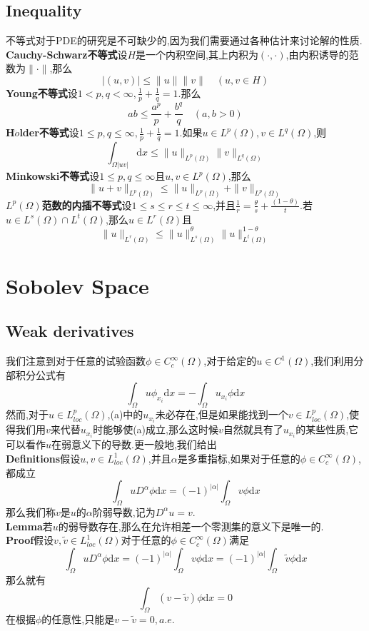 \documentclass[a4paper,UTF8,12pt]{ctexart}
\begin{document}
\subsection{Inequality}
不等式对于PDE的研究是不可缺少的,因为我们需要通过各种估计来讨论解的性质.\\
\textbf{Cauchy-Schwarz不等式}\quad 设$H$是一个内积空间,其上内积为$(\cdot,\cdot)$,由内积诱导的范数为$\|\cdot\|$,那么
$$
|(u,v)|\leqslant\|u\|\|v\|\quad (u,v\in H)
$$
\textbf{Young不等式}\quad 设$1<p,q<\infty,\frac{1}{p}+\frac{1}{q}=1$.那么
$$
ab\leqslant \frac{a^p}{p}+\frac{b^q}{q}\quad (a,b>0)
$$
\textbf{H$\ddot{o}$lder不等式}\quad 设$1\leqslant p,q\leqslant\infty,\frac{1}{p}+\frac{1}{q}=1$.如果$u\in L^p(\Omega),v\in L^q(\Omega)$,则
$$
\int_{\Omega|uv|}\mathrm{d}x\leqslant \|u\|_{L^p(\Omega)}\|v\|_{L^q(\Omega)}
$$
\textbf{Minkowski不等式}\quad 设$1\leqslant p,q\leqslant\infty$且$u,v\in L^p(\Omega)$,那么
$$
\|u+v\|_{L^p(\Omega)}\leqslant \|u\|_{L^p(\Omega)}+\|v\|_{L^p(\Omega)}
$$
\textbf{$L^p(\Omega)$范数的内插不等式}\quad 设$1\leqslant s\leqslant r\leqslant t\leqslant \infty$,并且$\frac{1}{r}=\frac{\theta}{s}+\frac{(1-\theta)}{t}$.若$u\in L^s(\Omega)\cap L^t(\Omega)$,那么$u\in L^r(\Omega)$且
$$
\|u\|_{L^r(\Omega)}\leqslant\|u\|^{\theta}_{L^s(\Omega)}\|u\|^{1-\theta}_{L^t(\Omega)}
$$
\section{Sobolev Space}
\subsection{Weak derivatives}
我们注意到对于任意的试验函数$\phi \in C^\infty _c(\Omega)$,对于给定的$u\in C^1(\Omega)$,我们利用分部积分公式有
\begin{equation}
    \int_{\Omega}u\phi_{x_i}\mathrm{d}x=-\int_{\Omega}u_{x_i}\phi\mathrm{d}x \tag{a}
\end{equation}
然而,对于$u\in L^p_{loc}(\Omega)$,(a)中的$u_{x_i}$未必存在,但是如果能找到一个$v\in L^p_{loc}(\Omega)$,使得我们用$v$来代替$u_{x_i}$时能够使(a)成立,那么这时候$v$自然就具有了$u_{x_i}$的某些性质,它可以看作$u$在弱意义下的导数.更一般地,我们给出\\
\textbf{Definitions}\quad 假设$u,v\in L^1_{loc}(\Omega)$,并且$\alpha$是多重指标,如果对于任意的$\phi\in C^\infty _c(\Omega)$,都成立
$$
\int_{\Omega}uD^{\alpha}\phi\mathrm{d}x=(-1)^{|\alpha|}\int_{\Omega}v\phi\mathrm{d}x
$$
那么我们称$v$是$u$的$\alpha$阶弱导数,记为$D^{\alpha}u=v$.\\
\textbf{Lemma}\quad 若$u$的弱导数存在,那么在允许相差一个零测集的意义下是唯一的.\\
\textbf{Proof}\quad 假设$v,\tilde{v}\in L^1_{loc}(\Omega) $对于任意的$\phi \in C^\infty _c(\Omega)$满足
$$
\int_{\Omega}uD^{\alpha}\phi\mathrm{d}x=(-1)^{|\alpha|}\int_{\Omega}v\phi\mathrm{d}x=(-1)^{|\alpha|}\int_{\Omega}\tilde{v}\phi\mathrm{d}x
$$
那么就有
$$
\int_{\Omega}(v-\tilde{v})\phi\mathrm{d}x=0
$$
在根据$\phi$的任意性,只能是$v-\tilde{v}=0,a.e.$
\end{document}
